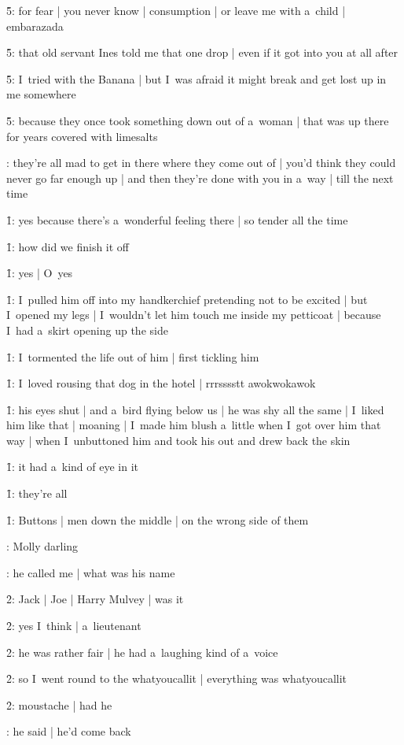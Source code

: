 \f5:
for fear |
you never know |
consumption |
or leave me with a~child |
embarazada

\f5:
that old servant Ines told me that one drop |
even if it got into you at all after

\f5:
I~tried with the Banana |
but I~was afraid it might break and get lost up in me somewhere

\f5:
because they once took something down out of a~woman |
that was up there for years covered with limesalts

:
they're all mad to get in there where they come out of |
you'd think they could never go far enough up |
and then they're done with you in a~way |
till the next time

\f1:
yes because there's a~wonderful feeling there |
so tender all the time

\f1:
how did we finish it off

\f1:
yes |
O~yes

\f1:
I~pulled him off into my handkerchief pretending not to be excited |
but I~opened my legs |
I~wouldn't let him touch me inside my petticoat |
because I~had a~skirt opening up the side

\f1:
I~tormented the life out of him |
first tickling him

\f1:
I~loved rousing that dog in the hotel |
rrrsssstt awokwokawok

\f1:
his eyes shut |
and a~bird flying below us |
he was shy all the same |
I~liked him like that |
moaning |
I~made him blush a~little when I~got over him that way |
when I~unbuttoned him and took his out and drew back the skin

\f1:
it had a~kind of eye in it

\f1:
they're all

\f1:
Buttons |
men down the middle |
on the wrong side of them

:
Molly darling

:
he called me |
what was his name

\f2:
Jack |
Joe |
Harry Mulvey |
was it

\f2:
yes I~think |
a~lieutenant

\f2:
he was rather fair |
he had a~laughing kind of a~voice

\f2:
so I~went round to the whatyoucallit |
everything was whatyoucallit

\f2:
moustache |
had he

:
he said |
he'd come back

